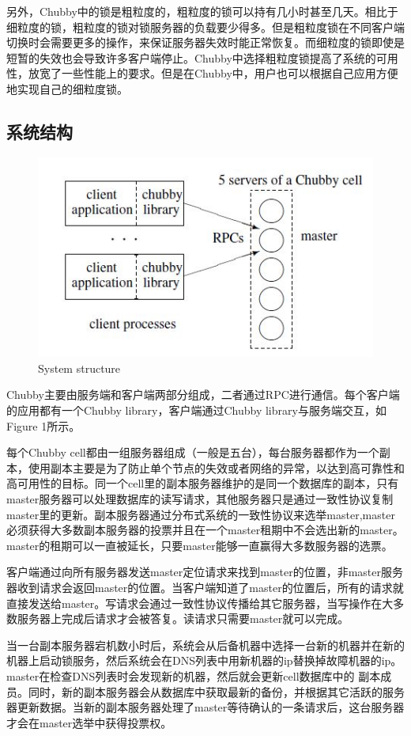 \documentclass[UTF8]{article}
\begin{document}
\indent 另外，Chubby中的锁是粗粒度的，粗粒度的锁可以持有几小时甚至几天。相比于细粒度的锁，粗粒度的锁对锁服务器的负载要少得多。但是粗粒度锁在不同客户端切换时会需要更多的操作，来保证服务器失效时能正常恢复。而细粒度的锁即使是短暂的失效也会导致许多客户端停止。Chubby中选择粗粒度锁提高了系统的可用性，放宽了一些性能上的要求。但是在Chubby中，用户也可以根据自己应用方便地实现自己的细粒度锁。
	\subsection{系统结构}

\begin{figure}[htbp]
\centering
\small
\includegraphics{1.JPG}
\caption{System structure}
\end{figure}
	Chubby主要由服务端和客户端两部分组成，二者通过RPC进行通信。每个客户端的应用都有一个Chubby library，客户端通过Chubby library与服务端交互，如Figure 1所示。
	
	每个Chubby cell都由一组服务器组成（一般是五台），每台服务器都作为一个副本，使用副本主要是为了防止单个节点的失效或者网络的异常，以达到高可靠性和高可用性的目标。同一个cell里的副本服务器维护的是同一个数据库的副本，只有master服务器可以处理数据库的读写请求，其他服务器只是通过一致性协议复制master里的更新。副本服务器通过分布式系统的一致性协议来选举master,master必须获得大多数副本服务器的投票并且在一个master租期中不会选出新的master。master的租期可以一直被延长，只要master能够一直赢得大多数服务器的选票。

	客户端通过向所有服务器发送master定位请求来找到master的位置，非master服务器收到请求会返回master的位置。当客户端知道了master的位置后，所有的请求就直接发送给master。写请求会通过一致性协议传播给其它服务器，当写操作在大多数服务器上完成后请求才会被答复。读请求只需要master就可以完成。

	当一台副本服务器宕机数小时后，系统会从后备机器中选择一台新的机器并在新的机器上启动锁服务，然后系统会在DNS列表中用新机器的ip替换掉故障机器的ip。master在检查DNS列表时会发现新的机器，然后就会更新cell数据库中的 副本成员。同时，新的副本服务器会从数据库中获取最新的备份，并根据其它活跃的服务器更新数据。当新的副本服务器处理了master等待确认的一条请求后，这台服务器才会在master选举中获得投票权。
\end{document}

